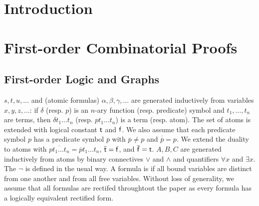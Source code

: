 \documentclass[conference]{IEEEtran}
\theoremstyle{definition}
\begin{document}
\maketitle

\begin{abstract}
\end{abstract}





%
\IEEEpeerreviewmaketitle

\section{Introduction}

\section{First-order Combinatorial Proofs}
\subsection{First-order Logic and Graphs}

 $s, t, u, \ldots$ and  (atomic formulas) $\alpha, \beta,
\gamma, \ldots$ are generated inductively from variables $x, y, z, \ldots$: if
$\delta$ (resp. $p$) is an $n$-ary function (resp. predicate) symbol and $t_1, \ldots,
t_n$ are terms, then $\delta t_1 \ldots t_n$ (resp. $pt_1 \ldots t_n$) is a term
(resp. atom). The set of atoms is extended with logical constant ${\mathsf t}$ and
${\mathsf f}$. We also assume that each predicate symbol $p$ has a 
predicate symbol $\overline{p}$ with $\overline{p} \neq p$ and
$\overline{\overline{p}} = p$. We extend the duality to atoms with
$\overline{pt_1 \ldots t_n} = \overline{p}t_1 \ldots t_n$, $\overline{{\mathsf t}} =
{\mathsf f}$, and $\overline{{\mathsf f}} = {\mathsf t}$.  $A, B, C$ are generated inductively from atoms by binary
connectives $\vee$ and $\wedge$ and quantifiers $\forall x$ and $\exists x$.
The  $\neg$ is defined in the usual way. A formula is  if all bound variables are distinct from one another and from all free variables. Without loss of generality, we assume that all formulas are rectifed throughtout the paper as every formula has a logically equivalent rectified form.
\end{document}
